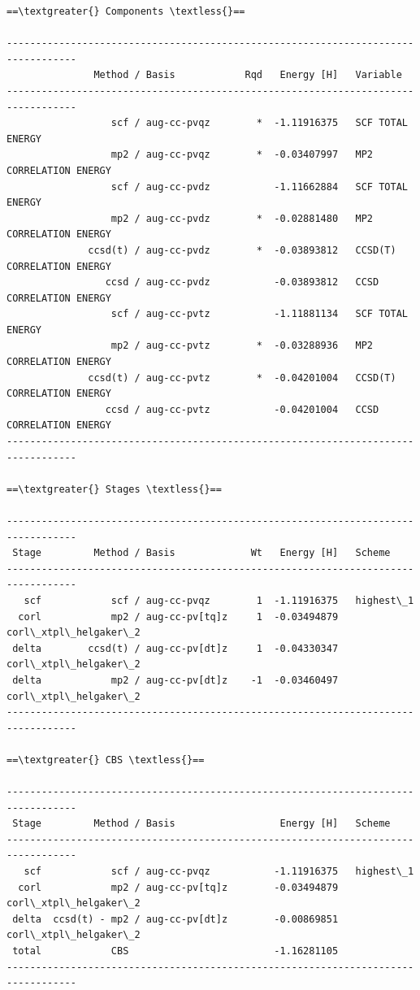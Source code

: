 \documentclass[letterpaper,10pt,english]{sphinxmanual}
\begin{document}
\begin{Verbatim}[commandchars=\\\{\}]
==\textgreater{} Components \textless{}==

----------------------------------------------------------------------------------
               Method / Basis            Rqd   Energy [H]   Variable
----------------------------------------------------------------------------------
                  scf / aug-cc-pvqz        *  -1.11916375   SCF TOTAL ENERGY
                  mp2 / aug-cc-pvqz        *  -0.03407997   MP2 CORRELATION ENERGY
                  scf / aug-cc-pvdz           -1.11662884   SCF TOTAL ENERGY
                  mp2 / aug-cc-pvdz        *  -0.02881480   MP2 CORRELATION ENERGY
              ccsd(t) / aug-cc-pvdz        *  -0.03893812   CCSD(T) CORRELATION ENERGY
                 ccsd / aug-cc-pvdz           -0.03893812   CCSD CORRELATION ENERGY
                  scf / aug-cc-pvtz           -1.11881134   SCF TOTAL ENERGY
                  mp2 / aug-cc-pvtz        *  -0.03288936   MP2 CORRELATION ENERGY
              ccsd(t) / aug-cc-pvtz        *  -0.04201004   CCSD(T) CORRELATION ENERGY
                 ccsd / aug-cc-pvtz           -0.04201004   CCSD CORRELATION ENERGY
----------------------------------------------------------------------------------

==\textgreater{} Stages \textless{}==

----------------------------------------------------------------------------------
 Stage         Method / Basis             Wt   Energy [H]   Scheme
----------------------------------------------------------------------------------
   scf            scf / aug-cc-pvqz        1  -1.11916375   highest\_1
  corl            mp2 / aug-cc-pv[tq]z     1  -0.03494879   corl\_xtpl\_helgaker\_2
 delta        ccsd(t) / aug-cc-pv[dt]z     1  -0.04330347   corl\_xtpl\_helgaker\_2
 delta            mp2 / aug-cc-pv[dt]z    -1  -0.03460497   corl\_xtpl\_helgaker\_2
----------------------------------------------------------------------------------

==\textgreater{} CBS \textless{}==

----------------------------------------------------------------------------------
 Stage         Method / Basis                  Energy [H]   Scheme
----------------------------------------------------------------------------------
   scf            scf / aug-cc-pvqz           -1.11916375   highest\_1
  corl            mp2 / aug-cc-pv[tq]z        -0.03494879   corl\_xtpl\_helgaker\_2
 delta  ccsd(t) - mp2 / aug-cc-pv[dt]z        -0.00869851   corl\_xtpl\_helgaker\_2
 total            CBS                         -1.16281105
----------------------------------------------------------------------------------
\end{Verbatim}
\end{document}
